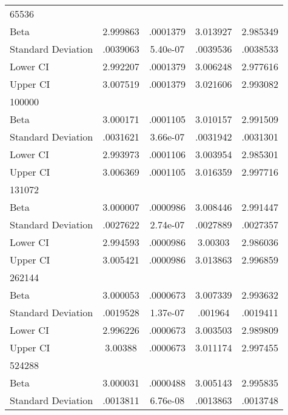 {\begin{tabular}{l*{1}{cccc}}
\hline
65536               &            &            &            &            \\
Beta                &    2.999863&    .0001379&    3.013927&    2.985349\\
Standard Deviation  &    .0039063&    5.40e-07&    .0039536&    .0038533\\
Lower CI            &    2.992207&    .0001379&    3.006248&    2.977616\\
Upper CI            &    3.007519&    .0001379&    3.021606&    2.993082\\
\hline
100000              &            &            &            &            \\
Beta                &    3.000171&    .0001105&    3.010157&    2.991509\\
Standard Deviation  &    .0031621&    3.66e-07&    .0031942&    .0031301\\
Lower CI            &    2.993973&    .0001106&    3.003954&    2.985301\\
Upper CI            &    3.006369&    .0001105&    3.016359&    2.997716\\
\hline
131072              &            &            &            &            \\
Beta                &    3.000007&    .0000986&    3.008446&    2.991447\\
Standard Deviation  &    .0027622&    2.74e-07&    .0027889&    .0027357\\
Lower CI            &    2.994593&    .0000986&     3.00303&    2.986036\\
Upper CI            &    3.005421&    .0000986&    3.013863&    2.996859\\
\hline
262144              &            &            &            &            \\
Beta                &    3.000053&    .0000673&    3.007339&    2.993632\\
Standard Deviation  &    .0019528&    1.37e-07&     .001964&    .0019411\\
Lower CI            &    2.996226&    .0000673&    3.003503&    2.989809\\
Upper CI            &     3.00388&    .0000673&    3.011174&    2.997455\\
\hline
524288              &            &            &            &            \\
Beta                &    3.000031&    .0000488&    3.005143&    2.995835\\
Standard Deviation  &    .0013811&    6.76e-08&    .0013863&    .0013748\\

\end{tabular}}
